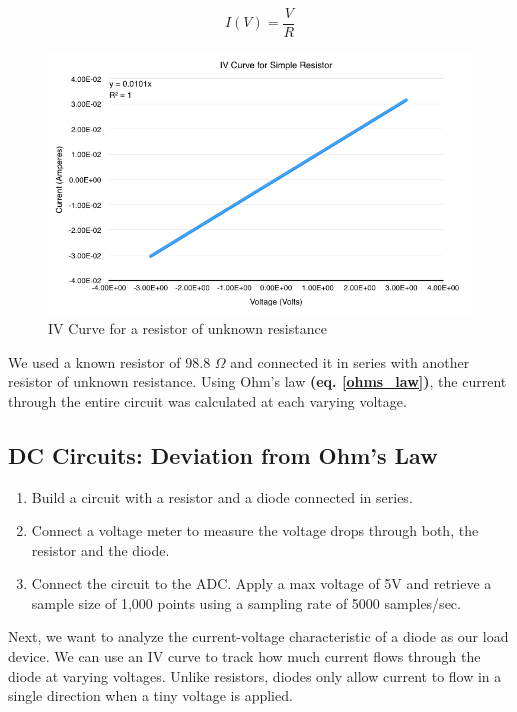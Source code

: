 \documentclass{article}
\begin{document}
\begin{equation}
    \label{ohms_law}
    I(V) = \frac{V}{R}
\end{equation}

\begin{figure}[H]
    \centering
    \includegraphics[width=\textwidth]{charts/ivcurve_simpleresistor}
    \caption{IV Curve for a resistor of unknown resistance}
    \label{ivcurve_simpleresistor}
\end{figure}

We used a known resistor of 98.8 $\Omega$ and connected it in series with
another resistor of unknown resistance. Using Ohm's law \textbf{(eq.
\ref{ohms_law})}, the current through the entire circuit was calculated at each
varying voltage.

\subsection{DC Circuits: Deviation from Ohm's Law}

\begin{enumerate}
    \item Build a circuit with a resistor and a diode connected in series.
    \item Connect a voltage meter to measure the voltage drops through both, the
    resistor and the diode.
    \item Connect the circuit to the ADC. Apply a max voltage of 5V and retrieve
    a sample size of 1,000 points using a sampling rate of 5000 samples/sec.
\end{enumerate}

Next, we want to analyze the current-voltage characteristic of a diode as our
load device. We can use an IV curve to track how much current flows through the
diode at varying voltages. Unlike resistors, diodes only allow current to flow
in a single direction when a tiny voltage is applied. 
\end{document}
